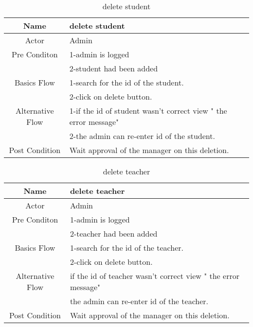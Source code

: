 \documentclass{article}
\begin{document}
	\begin{table}[!h]
		\caption{delete student}
		\centering
		\label{delete student}
		\begin{tabular}{|c|l|}
			\hline
			Name             &delete student\\
			\hline
			Actor            &Admin\\
			\hline
			Pre Conditon     &1-admin is logged\\
			                 &2-student had been added \\
			\hline
			
			Basics Flow      &1-search for the id of the student.\\ 
			                 &2-click on delete button.\\
			
			\hline
			Alternative Flow & 1-if the id of student wasn't correct     view " the error message" \\
			                 & 2-the admin can  re-enter id of the student.
			\\
			\hline
			Post Condition   &Wait approval of the manager on this deletion.\\
			\hline
		\end{tabular}
	\end{table}
	
	\begin{table}[!h]
		\caption{delete teacher}
		\centering
		\label{delete teacher}
		\begin{tabular}{|c|l|}
			\hline
			Name             &delete teacher\\
			\hline
			Actor            &Admin\\
			\hline
			Pre Conditon     &1-admin is logged\\
			                 &2-teacher had been added \\
			\hline
			
			Basics Flow      &1-search for the id of the teacher.\\ 
			                 &2-click on delete button. \\
			
			\hline
			Alternative Flow &if the id of teacher wasn't correct view " the error message" \\
			                 & the admin can  re-enter id of the teacher.
			\\
			\hline
			Post Condition   &Wait approval of the manager on this deletion.\\
			\hline
		\end{tabular}
	\end{table}
	
\end{document}
